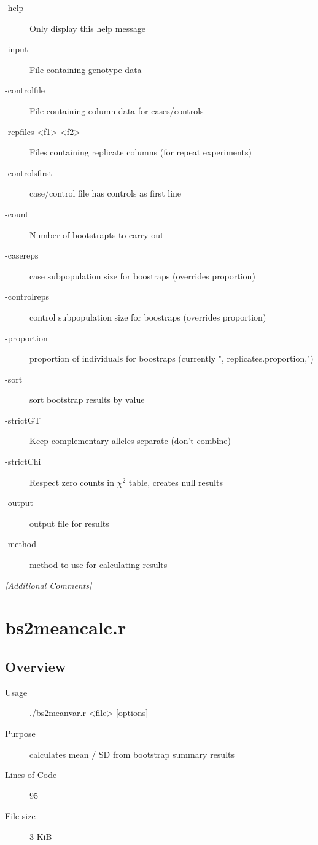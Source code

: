 \begin{description}
\item[-help] Only display this help message
\item[-input] File containing genotype data
\item[-controlfile] File containing column data for cases/controls
\item[-repfiles <f1> <f2>] Files containing replicate columns (for repeat experiments)
\item[-controlsfirst] case/control file has controls as first line
\item[-count] Number of bootstrapts to carry out
\item[-casereps] case subpopulation size for boostraps (overrides proportion)
\item[-controlreps] control subpopulation size for boostraps (overrides proportion)
\item[-proportion] proportion of individuals for boostraps (currently ", replicates.proportion,")
\item[-sort] sort bootstrap results by value
\item[-strictGT] Keep complementary alleles separate (don't combine)
\item[-strictChi] Respect zero counts in $\chi^2$ table, creates null results
\item[-output] output file for results
\item[-method] method to use for calculating results
\end{description}

\emph{[Additional Comments]}

\section{bs2meancalc.r}
\label{sec:bs2meancalc.r}

\subsection{Overview}
\label{sec:bs2meancalc.r-overview}

\begin{description}
\item[Usage] ./bs2meanvar.r <file> [options]
\item[Purpose] calculates mean / SD from bootstrap summary results
\item[Lines of Code] 95
\item[File size] 3 KiB
\end{description}

